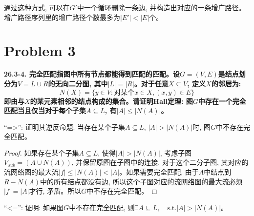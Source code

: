 \documentclass[paper=a4, fontsize=11pt]{scrartcl} %
\numberwithin{equation}{section} %
\numberwithin{figure}{section} %
\numberwithin{table}{section} %
\begin{document}
通过这种方式, 可以在$G'$中一个循环删除一条边, 并构造出对应的一条增广路径。增广路径序列里的增广路径个数最多为$|E'| < |E|$个。

\section{Problem 3}
\textbf{26.3-4. 完全匹配指图中所有节点都能得到匹配的匹配。设$G = (V, E)$是结点划分为$V = L \cup R$的无向二分图, 其中$|L| = |R|$。对于任意$X \subseteq V$, 定义$X$的邻居为:}
\[
N(X) = \{ y \in V: \mbox{对某个}x \in X, (x,y) \in E\}
\]
\textbf{即由与$X$的某元素相邻的结点构成的集合。请证明Hall定理: 图$G$中存在一个完全匹配当且仅当对于每个子集$A \subseteq L$, 有$|A| \leq |N(A)|$。}

``=>'': 证明其逆反命题: 当存在某个子集$A \subseteq L$, $|A| > |N(A)|$时, 图$G$中不存在完全匹配。

\begin{proof}
  如果存在某个子集$A \subseteq L$, 使得$|A| > |N(A)|$, 考虑子图$V_{sub} = (A \cup N(A))$, 并保留原图在子图中的连接, 对于这个二分子图, 其对应的流网络图的最大流$|f| \leq |N(A)| < |A|$。如果需要完全匹配, 由于$A$中结点到$R - N(A)$中的所有结点都没有边, 所以这个子图对应的流网络图的最大流必须$|f|=|A|$才行, 矛盾。所以$G$中不存在完全匹配。
\end{proof}

``<='': 证明: 如果图$G$中不存在完全匹配, 则$\exists A \subseteq L, \quad\mbox{s.t.} |A| > |N(A)|$。
\end{document}
